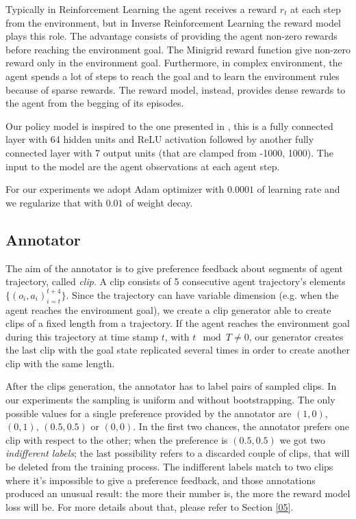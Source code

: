 Typically in Reinforcement Learning the agent receives a reward $r_t$ at each step from the environment, but in Inverse Reinforcement Learning the reward model plays this role. The advantage consists of providing the agent non-zero rewards before reaching the environment goal. The Minigrid reward function give non-zero reward only in the environment goal.
Furthermore, in complex environment, the agent spends a lot of steps to reach the goal and to learn the environment rules because of sparse rewards. The reward model, instead, provides dense rewards to the agent from the begging of its episodes. 

Our policy model is inspired to the one presented in \cite{karpathy}, this is a fully connected layer with 64 hidden units and ReLU activation followed by another fully connected layer with 7 output units (that are clamped from -1000, 1000). The input to the model are the agent observations at each agent step. 

For our experiments we adopt Adam optimizer with $0.0001$ of learning rate and we regularize that with $0.01$ of weight decay. 

\subsection{Annotator}
The aim of the annotator is to give preference feedback about segments of agent trajectory, called \textit{clip}. A clip consists of 5 consecutive agent trajectory's elements $\{(o_i, a_i)_{i=t}^{t+4}\}$. Since the trajectory can have variable dimension (e.g. when the agent reaches the environment goal), we create a clip generator able to create clips of a fixed length from a trajectory. If the agent reaches the environment goal during this trajectory at time stamp $t$, with $t \mod T \not= 0$, our generator creates the last clip with the goal state replicated several times in order to create another clip with the same length.

After the clips generation, the annotator has to label pairs of sampled clips. In our experiments the sampling is uniform and without bootstrapping. The only possible values for a single preference provided by the annotator are $(1,0)$, $(0,1)$, $(0.5,0.5)$ or $(0,0)$. In the first two chances, the annotator prefers one clip with respect to the other; when the preference is $(0.5,0.5)$ we got two \textit{indifferent labels}; the last possibility refers to a discarded couple of clips, that will be deleted from the training process. The indifferent labels match to two clips where it's impossible to give a preference feedback, and those annotations produced an unusual result: the more their number is, the more the reward model loss will be. For more details about that, please refer to Section \ref{05}.


